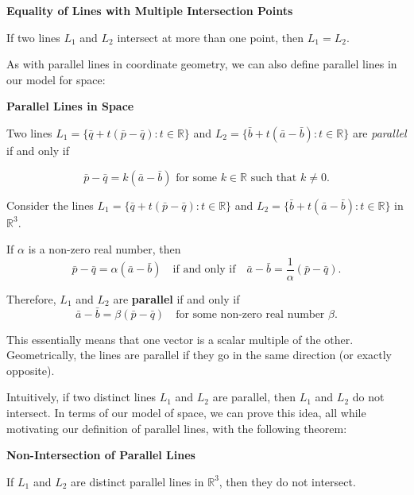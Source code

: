 \begin{theorembox}
  
  \textbf{Equality of Lines with Multiple Intersection Points}

If two lines $L_1$ and $L_2$ intersect at more than one point, then $L_1 = L_2$.
\end{theorembox}



\vspace{1em}
  As with parallel lines in coordinate geometry, we can also define parallel lines in our model for space:
  \begin{definitionbox}
    \textbf{Parallel Lines in Space}

    Two lines $L_1 = \{\bar{q} +t(\bar{p} - \bar{q}) : t \in \mathbb{R}\}$ and $L_2 = \{\bar{b} +t(\bar{a} - \bar{b}) : t \in \mathbb{R}\}$ are \textit{parallel} if and only if

    \[
      \bar{p}-\bar{q} = k(\bar{a}-\bar{b}) \text{ for some } k \in \mathbb{R} \text{ such that } k \neq 0.
    \]

  \end{definitionbox}

\begin{remarkbox}
 Consider the lines $L_1 = \{ \bar{q} + t(\bar{p} - \bar{q}) : t \in \mathbb{R} \}$ and $L_2 = \{ \bar{b} + t(\bar{a} - \bar{b}) : t \in \mathbb{R} \}$
in $ \mathbb{R}^3$.

If \( \alpha \) is a non-zero real number, then
\[
\bar{p} - \bar{q} = \alpha (\bar{a} - \bar{b}) \quad \text{if and only if} \quad
\bar{a} - \bar{b} = \frac{1}{\alpha}(\bar{p} - \bar{q}).
\]

Therefore, \( L_1 \) and \( L_2 \) are \textbf{parallel} if and only if
\[
\bar{a} - \bar{b} = \beta (\bar{p} - \bar{q}) \quad \text{for some non-zero real number } \beta.
\]

This essentially means that one vector is a scalar multiple of the other. Geometrically, the lines are parallel if they go in the same direction (or exactly opposite).
\end{remarkbox}
\vspace{1em}
Intuitively, if two distinct lines \( L_1 \) and \( L_2 \) are parallel, then \( L_1 \) and \( L_2 \) do not intersect.
In terms of our model of space, we can prove this idea, all while motivating our definition of parallel lines, with the following theorem:

\begin{theorembox}
  \textbf{Non-Intersection of Parallel Lines}

  If $L_1$ and $L_2$ are distinct parallel lines in $\mathbb{R}^3$, then they do not intersect.
\end{theorembox}

